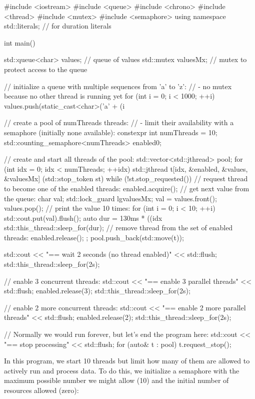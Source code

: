 \begin{cpp}
#include <iostream>
#include <queue>
#include <chrono>
#include <thread>
#include <mutex>
#include <semaphore>
using namespace std::literals; // for duration literals

int main()
{
	std::queue<char> values; // queue of values
	std::mutex valuesMx; // mutex to protect access to the queue
	
	// initialize a queue with multiple sequences from ’a’ to ’z’:
	// - no mutex because no other thread is running yet
	for (int i = 0; i < 1000; ++i) {
		values.push(static_cast<char>('a' + (i %
	}
	
	// create a pool of numThreads threads:
	// - limit their availability with a semaphore (initially none available):
	constexpr int numThreads = 10;
	std::counting_semaphore<numThreads> enabled{0};
	
	// create and start all threads of the pool:
	std::vector<std::jthread> pool;
	for (int idx = 0; idx < numThreads; ++idx) {
		std::jthread t{[idx, &enabled, &values, &valuesMx] (std::stop_token st) {
				while (!st.stop_requested()) {
					// request thread to become one of the enabled threads:
					enabled.acquire();
					// get next value from the queue:
					char val;
					{
						std::lock_guard lg{valuesMx};
						val = values.front();
						values.pop();
					}
					// print the value 10 times:
					for (int i = 0; i < 10; ++i) {
						std::cout.put(val).flush();
						auto dur = 130ms * ((idx %
						std::this_thread::sleep_for(dur);
					}
					// remove thread from the set of enabled threads:
					enabled.release();
					}
				}};
		pool.push_back(std::move(t));
	}
	
	std::cout << "== wait 2 seconds (no thread enabled)\n" << std::flush;
	std::this_thread::sleep_for(2s);
	
	// enable 3 concurrent threads:
	std::cout << "== enable 3 parallel threads\n" << std::flush;
	enabled.release(3);
	std::this_thread::sleep_for(2s);
	
	// enable 2 more concurrent threads:
	std::cout << "\n== enable 2 more parallel threads\n" << std::flush;
	enabled.release(2);
	std::this_thread::sleep_for(2s);
	
	// Normally we would run forever, but let’s end the program here:
	std::cout << "\n== stop processing\n" << std::flush;
	for (auto& t : pool) {
	t.request_stop();
	}
}
\end{cpp}

In this program, we start 10 threads but limit how many of them are allowed to actively run and process data. To do this, we initialize a semaphore with the maximum possible number we might allow (10) and the initial number of resources allowed (zero):

